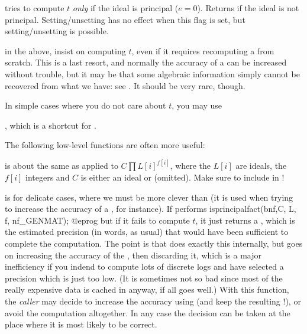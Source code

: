 \item {} tries to compute $t$ \emph{only} if the
ideal is principal ($e = 0$). Returns  if the ideal is not
principal. Setting/unsetting  has no effect when this flag is
set, but setting/unsetting  is possible.

\item {} in the above, insist on computing $t$, even if it
requires recomputing a  from scratch. This is a last resort, and
normally the accuracy of a  can be increased without trouble, but it
may be that some algebraic information simply cannot be recovered from what
we have: see . It should be very rare, though.

In simple cases where you do not care about $t$, you may use

, which is a shortcut for
.

The following low-level functions are often more useful:

 is
about the same as  applied to $C \prod L[i]^{f[i]}$,
where the $L[i]$ are ideals, the $f[i]$ integers and $C$ is either an ideal
or  (omitted). Make sure to include  in !

 is
for delicate cases, where we must be more clever than 
(it is used when trying to increase the accuracy of a , for
instance). If performs
\bprog
  isprincipalfact(bnf,C, L, f, nf_GENMAT);
@eprog\noindent
but if it fails to compute $t$, it just returns a , which is the
estimated precision (in words, as usual) that would have been sufficient to
complete the computation. The point is that  does exactly this
internally, but goes on increasing the accuracy of the , then
discarding it, which is a major inefficiency if you indend to compute lots of
discrete logs and have selected a precision which is just too low.
(It is sometimes not so bad since most of the really expensive data is cached
in  anyway, if all goes well.)  With this function, the \emph{caller}
may decide to increase the accuracy using  (and keep the
resulting !), or avoid the computation altogether. In any case the
decision can be taken at the place where it is most likely to be correct.

